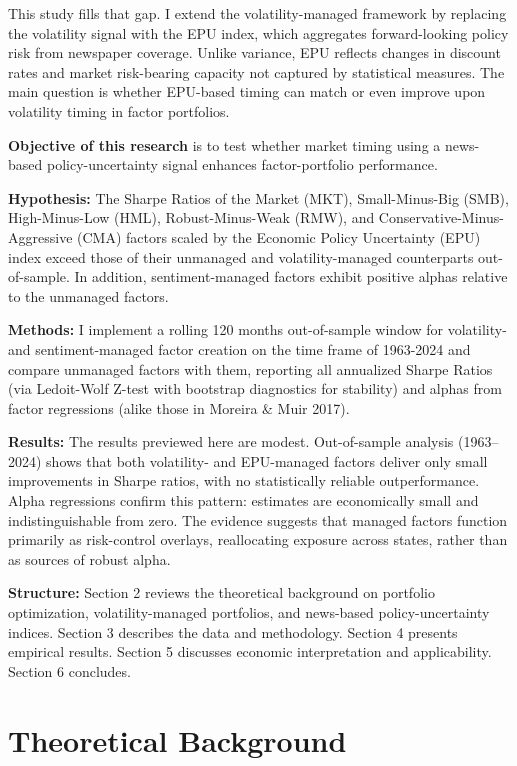This study fills that gap. I extend the volatility-managed framework by replacing the volatility signal with the EPU index, which aggregates forward-looking policy risk from newspaper coverage. Unlike variance, EPU reflects changes in discount rates and market risk-bearing capacity not captured by statistical measures. The main question is whether EPU-based timing can match or even improve upon volatility timing in factor portfolios.

\textbf{Objective of this research} is to test whether market timing using a news-based policy-uncertainty signal enhances factor-portfolio performance.

\textbf{Hypothesis:} The Sharpe Ratios of the Market (MKT), Small-Minus-Big (SMB), High-Minus-Low (HML), Robust-Minus-Weak (RMW), and Conservative-Minus-Aggressive (CMA) factors scaled by the Economic Policy Uncertainty (EPU) index exceed those of their unmanaged and volatility-managed counterparts out-of-sample. In addition, sentiment-managed factors exhibit positive alphas relative to the unmanaged factors.

\textbf{Methods:} I implement a rolling 120 months out-of-sample window for volatility- and sentiment-managed factor creation on the time frame of 1963-2024 and compare unmanaged factors with them, reporting all annualized Sharpe Ratios (via Ledoit-Wolf Z-test with bootstrap diagnostics for stability) and alphas from factor regressions (alike those in Moreira \& Muir 2017).

\textbf{Results:} The results previewed here are modest. Out-of-sample analysis (1963–2024) shows that both volatility- and EPU-managed factors deliver only small improvements in Sharpe ratios, with no statistically reliable outperformance. Alpha regressions confirm this pattern: estimates are economically small and indistinguishable from zero. The evidence suggests that managed factors function primarily as risk-control overlays, reallocating exposure across states, rather than as sources of robust alpha.

\textbf{Structure:} Section 2 reviews the theoretical background on portfolio optimization, volatility-managed portfolios, and news-based policy-uncertainty indices. Section 3 describes the data and methodology. Section 4 presents empirical results. Section 5 discusses economic interpretation and applicability. Section 6 concludes.

\chapter{Theoretical Background}

